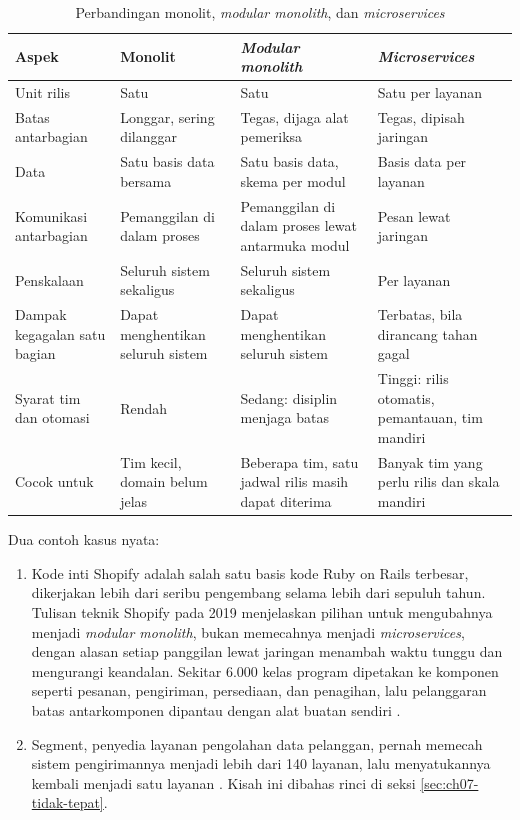 \begin{table}[!htb]
  \centering
  \caption{Perbandingan monolit, \textit{modular monolith}, dan \textit{microservices}}
  \label{tab:ch07-tiga-gaya}
  \footnotesize
  \begin{tabularx}{\textwidth}{>{\raggedright\arraybackslash}p{2.3cm} >{\raggedright\arraybackslash}X >{\raggedright\arraybackslash}X >{\raggedright\arraybackslash}X}
    \hline
    \textbf{Aspek} & \textbf{Monolit} & \textbf{\textit{Modular monolith}} &
      \textbf{\textit{Microservices}} \\ \hline
    Unit rilis & Satu & Satu & Satu per layanan \\ \hline
    Batas antarbagian & Longgar, sering dilanggar & Tegas, dijaga alat pemeriksa & Tegas,
      dipisah jaringan \\ \hline
    Data & Satu basis data bersama & Satu basis data, skema per modul & Basis data per layanan \\
      \hline
    Komunikasi antarbagian & Pemanggilan di dalam proses & Pemanggilan di dalam proses lewat
      antarmuka modul & Pesan lewat jaringan \\ \hline
    Penskalaan & Seluruh sistem sekaligus & Seluruh sistem sekaligus & Per layanan \\ \hline
    Dampak kegagalan satu bagian & Dapat menghentikan seluruh sistem & Dapat menghentikan seluruh
      sistem & Terbatas, bila dirancang tahan gagal \\ \hline
    Syarat tim dan otomasi & Rendah & Sedang: disiplin menjaga batas & Tinggi: rilis otomatis,
      pemantauan, tim mandiri \\ \hline
    Cocok untuk & Tim kecil, domain belum jelas & Beberapa tim, satu jadwal rilis masih dapat
      diterima & Banyak tim yang perlu rilis dan skala mandiri \\ \hline
  \end{tabularx}
\end{table}

Dua contoh kasus nyata:
\begin{enumerate}
  \item Kode inti Shopify adalah salah satu basis kode Ruby on Rails terbesar, dikerjakan lebih
        dari seribu pengembang selama lebih dari sepuluh tahun. Tulisan teknik Shopify pada 2019
        menjelaskan pilihan untuk mengubahnya menjadi \textit{modular monolith}, bukan memecahnya
        menjadi \textit{microservices}, dengan alasan setiap panggilan lewat jaringan menambah
        waktu tunggu dan mengurangi keandalan. Sekitar 6.000 kelas program dipetakan ke komponen
        seperti pesanan, pengiriman, persediaan, dan penagihan, lalu pelanggaran batas
        antarkomponen dipantau dengan alat buatan sendiri \cite{c07-westeinde2019}.
  \item Segment, penyedia layanan pengolahan data pelanggan, pernah memecah sistem pengirimannya
        menjadi lebih dari 140 layanan, lalu menyatukannya kembali menjadi satu layanan
        \cite{noonan2018}. Kisah ini dibahas rinci di seksi \ref{sec:ch07-tidak-tepat}.
\end{enumerate}

